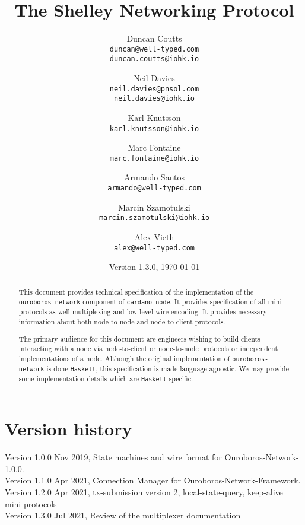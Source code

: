 \documentclass{report}
\begin{document}
\title{The Shelley Networking Protocol}
\author{
  Duncan Coutts \\
  {\small \texttt{duncan@well-typed.com}} \\
  {\small \texttt{duncan.coutts@iohk.io}}
\and
  Neil Davies \\
  {\small \texttt{neil.davies@pnsol.com}} \\
  {\small \texttt{neil.davies@iohk.io}}
\and
  Karl Knutsson \\
  {\small \texttt{karl.knutsson@iohk.io}}
\and
  Marc Fontaine \\
  {\small \texttt{marc.fontaine@iohk.io}}
\and
  Armando Santos \\
  {\small \texttt{armando@well-typed.com}}
\and
  Marcin Szamotulski \\
  {\small \texttt{marcin.szamotulski@iohk.io}}
\and
  Alex Vieth \\
  {\small \texttt{alex@well-typed.com}}
}
\date{{\small Version 1.3.0, \today}}

\maketitle

\begin{abstract}
  This document provides technical specification of the implementation of the
  \texttt{ouroboros-network} component of \texttt{cardano-node}. It provides specification of all
  mini-protocols as well multiplexing and low level wire encoding.  It provides
  necessary information about both node-to-node and node-to-client protocols.

  The primary audience for this document are engineers wishing to build
  clients interacting with a node via node-to-client or node-to-node protocols
  or independent implementations of a node.  Although the original
  implementation of \texttt{ouroboros-network} is done \texttt{Haskell}, this specification is
  made language agnostic. We may provide some implementation details which are
  \texttt{Haskell} specific.
\end{abstract}

\tableofcontents

\section*{Version history}

\begin{description}
\item[Version 1.0.0 Nov 2019, State machines and wire format for Ouroboros-Network-1.0.0.]
\item[Version 1.1.0 Apr 2021, Connection Manager for Ouroboros-Network-Framework.]
\item[Version 1.2.0 Apr 2021, tx-submission version 2, local-state-query, keep-alive mini-protocols]
\item[Version 1.3.0 Jul 2021, Review of the multiplexer documentation]
\end{description}
\listoftodos
% 




% 
\end{document}
